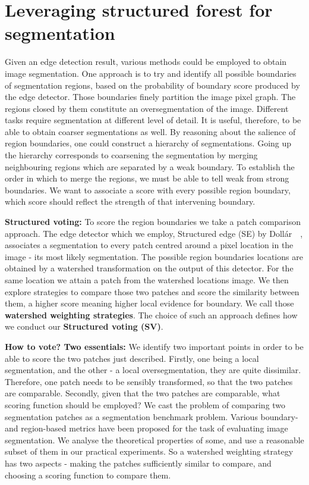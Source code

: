 \chapter{Leveraging structured forest for segmentation}
\label{Chapter4}
Given an edge detection result, various methods could be employed to obtain image segmentation.  One approach is to try and identify all possible boundaries of segmentation regions, based on the probability of boundary score produced by the edge detector. Those boundaries finely partition the image pixel graph. The regions closed by them constitute an oversegmentation of the image. Different tasks require segmentation at different level of detail. It is useful, therefore, to be able to obtain coarser segmentations as well. By reasoning about the salience of region boundaries, one could construct a hierarchy of segmentations. Going up the hierarchy corresponds to coarsening the segmentation by merging neighbouring regions which are separated by a weak boundary. To establish the order in which to merge the regions, we must be able to tell weak from strong boundaries. We want to associate a score with every possible region boundary, which score should reflect the strength of that intervening boundary.

\textbf{Structured voting:} To score the region boundaries we take a patch comparison approach. The edge detector which we employ, Structured edge (SE) by Doll\'ar~\etal~\cite{DollarICCV13edges}, associates a segmentation to every patch centred around a pixel location in the image - its most likely segmentation. The possible region boundaries locations are obtained by a watershed transformation on the output of this detector. For the same location we attain a patch from the watershed locations image. We then explore strategies to compare those two patches and score the similarity between them, a higher score meaning higher local evidence for boundary. We call those \textbf{watershed weighting strategies}. The choice of such an approach defines how we conduct our \textbf{Structured voting (SV)}.

\textbf{How to vote? Two essentials:} We identify two important points in order to be able to score the two patches just described. Firstly, one being a local segmentation, and the other - a local oversegmentation, they are quite dissimilar. Therefore, one patch needs to be sensibly transformed, so that the two patches are comparable. Secondly, given that the two patches are comparable, what scoring function should be employed? We cast the problem of comparing two segmentation patches as a segmentation benchmark problem. Various boundary- and region-based metrics have been proposed for the task of evaluating image segmentation. We analyse the theoretical properties of some, and use a reasonable subset of them in our practical experiments. So a watershed weighting strategy has two aspects - making the patches sufficiently similar to compare, and choosing a scoring function to compare them.

